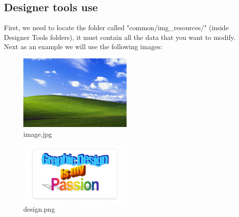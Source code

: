 \subsection{Designer tools use}
First, we need to locate the folder called "common/img\_resources/" (inside Designer Tools folders), it must contain all the data that you want to modify.\\
Next as an example we will use the following images:

    \begin{figure}[H]
        \centering
        \includegraphics[width=0.5\textwidth]{img/image.jpg}
        \caption{image.jpg}
        \label{fig:id_figura}
    \end{figure}
    \begin{figure}[H]
        \centering
        \includegraphics[width=0.5\textwidth]{img/design.png}
        \caption{design.png}
        \label{fig:id_figura}
    \end{figure}



